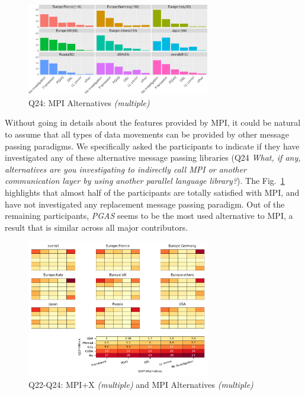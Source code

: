 \documentclass[preprint,5p,times]{elsarticle}
\def\myquote#1{{\it #1}}
\def\mcountries{major contributors\xspace{}}%
\begin{document}
\begin{figure}[tb]
\begin{center}
\includegraphics[width=8.0cm]{R-scripts/Q24.pdf}
\caption{Q24: MPI Alternatives {\it(multiple)}}
\label{fig:mpi-alternatives}
\vspace{-3mm}%
\end{center}
\end{figure}

Without going in details about the features provided by MPI, it could be natural
to assume that all types of data movements can be provided by other message
passing paradigms. We specifically asked the participants to indicate if they
have investigated any of these alternative message passing libraries (Q24
\myquote{What, if any, alternatives are you investigating to indirectly call MPI
or another communication layer by using another parallel language library?}).
The Fig.~\ref{fig:mpi-alternatives} highlights that almost half of the
participants are totally satisfied with MPI, and have not investigated any
replacement message passing paradigm. Out of the remaining participants,
\myquote{PGAS} seems to be the most used alternative to MPI, a result that is
similar across all \mcountries.


\begin{figure}[tb]
\begin{center}
\includegraphics[width=8.0cm]{Figs/Q22-Q24.pdf}
\caption{Q22-Q24: MPI+X {\it(multiple)} and MPI Alternatives {\it(multiple)}}
\label{fig:mpi-x-and-alternatives}
\vspace{-3mm}%
\end{center}
\end{figure}
\end{document}
